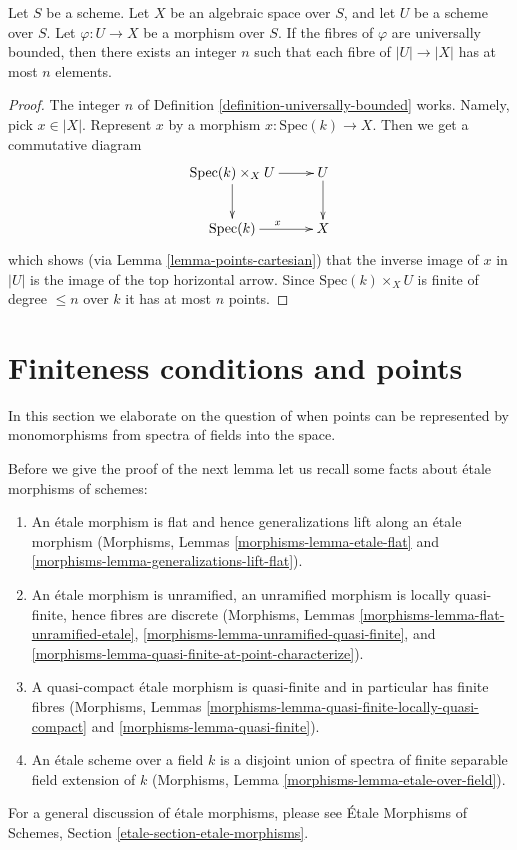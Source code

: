 \begin{lemma}
\label{lemma-universally-bounded-finite-fibres}
Let $S$ be a scheme.
Let $X$ be an algebraic space over $S$, and let $U$ be a scheme over $S$.
Let $\varphi : U \to X$ be a morphism over $S$.
If the fibres of $\varphi$ are universally bounded, then there exists an
integer $n$ such that each fibre of $|U| \to |X|$ has at most
$n$ elements.
\end{lemma}

\begin{proof}
The integer $n$ of Definition \ref{definition-universally-bounded} works.
Namely, pick $x \in |X|$. Represent $x$ by a morphism
$x : \text{Spec}(k) \to X$. Then we get a commutative diagram
$$
\xymatrix{
\text{Spec}(k) \times_X U \ar[r] \ar[d] & U \ar[d] \\
\text{Spec}(k) \ar[r]^x & X
}
$$
which shows (via Lemma \ref{lemma-points-cartesian})
that the inverse image of $x$ in $|U|$ is the image of
the top horizontal arrow. Since $\text{Spec}(k) \times_X U$ is finite
of degree $\leq n$ over $k$ it has at most $n$ points.
\end{proof}








\section{Finiteness conditions and points}
\label{section-points-monomorphisms}

\noindent
In this section we elaborate on the question of when points can be represented
by monomorphisms from spectra of fields into the space.

\begin{remark}
\label{remark-recall}
Before we give the proof of the next lemma let us recall some facts
about \'etale morphisms of schemes:
\begin{enumerate}
\item An \'etale morphism is flat and hence generalizations lift along
an \'etale morphism
(Morphisms, Lemmas \ref{morphisms-lemma-etale-flat}
and \ref{morphisms-lemma-generalizations-lift-flat}).
\item An \'etale morphism is unramified, an unramified morphism is locally
quasi-finite, hence fibres are discrete
(Morphisms, Lemmas \ref{morphisms-lemma-flat-unramified-etale},
\ref{morphisms-lemma-unramified-quasi-finite}, and
\ref{morphisms-lemma-quasi-finite-at-point-characterize}).
\item A quasi-compact \'etale morphism is quasi-finite and in particular
has finite fibres
(Morphisms, Lemmas \ref{morphisms-lemma-quasi-finite-locally-quasi-compact} and
\ref{morphisms-lemma-quasi-finite}).
\item An \'etale scheme over a field $k$ is a disjoint union of spectra
of finite separable field extension of $k$
(Morphisms, Lemma \ref{morphisms-lemma-etale-over-field}).
\end{enumerate}
For a general discussion of \'etale morphisms, please see
\'Etale Morphisms of Schemes, Section \ref{etale-section-etale-morphisms}.
\end{remark}

